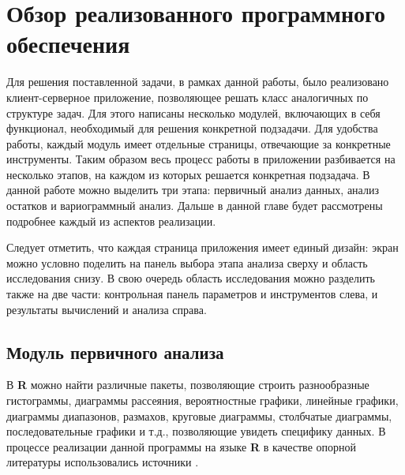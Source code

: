
\newpage

\chapter{Обзор реализованного программного обеспечения}

Для решения поставленной задачи, в рамках данной работы, было реализовано клиент-серверное приложение, позволяющее решать класс аналогичных по структуре задач. Для этого написаны несколько модулей, включающих в себя функционал, необходимый для решения конкретной подзадачи. Для удобства работы, каждый модуль имеет отдельные страницы, отвечающие за конкретные инструменты. Таким образом весь процесс работы в приложении разбивается на несколько этапов, на каждом из которых решается конкретная подзадача. В данной работе можно выделить три этапа: первичный анализ данных, анализ остатков и вариограммный анализ. Дальше в данной главе будет рассмотрены подробнее каждый из аспектов реализации.

Следует отметить, что каждая страница приложения имеет единый дизайн: экран можно условно поделить на панель выбора этапа анализа сверху и область исследования снизу. В свою очередь область исследования можно разделить также на две части: контрольная панель параметров и инструментов слева, и результаты вычислений и анализа справа.

\section{Модуль первичного анализа} %
\label{sec:mod_basis}

В \textbf{R} можно найти различные пакеты, позволяющие строить разнообразные гистограммы, диаграммы рассеяния, вероятностные графики, линейные графики, диаграммы диапазонов, размахов, круговые диаграммы, столбчатые диаграммы, последовательные графики и т.д., позволяющие увидеть специфику данных. В процессе реализации данной программы на языке \textbf{R} в качестве опорной литературы использовались источники \cite{Kabacoff2009R, Teetor2011RCook, Chang2012RGraph}.

